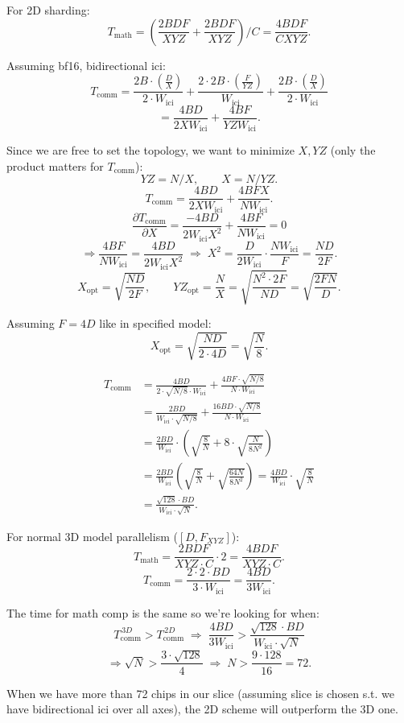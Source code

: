 \documentclass[11pt]{article}
\newcommand{\Tmath}{T_{\text{math}}}
\newcommand{\Tcomm}{T_{\text{comm}}}
\newcommand{\Wici}{W_{\text{ici}}}
\begin{document}
For 2D sharding:
\[
\Tmath = \left( \frac{2BDF}{XYZ} + \frac{2BDF}{XYZ} \right) \bigg/ C = \frac{4BDF}{CXYZ}.
\]

Assuming bf16, bidirectional ici:
\[
\Tcomm = \frac{2B \cdot \left( \frac{D}{X} \right)}{2 \cdot \Wici} + \frac{2 \cdot 2B \cdot \left( \frac{F}{YZ} \right)}{\Wici} + \frac{2B \cdot \left( \frac{D}{X} \right)}{2 \cdot \Wici}
\]
\[
= \frac{4BD}{2X\Wici} + \frac{4BF}{YZ\Wici}.
\]

Since we are free to set the topology, we want to minimize $X, YZ$ (only the product matters for $\Tcomm$):
\[
YZ = N/X, \qquad X = N/YZ.
\]
\[
\Tcomm = \frac{4BD}{2X\Wici} + \frac{4BFX}{N\Wici}.
\]
\[
\frac{\partial \Tcomm}{\partial X} = \frac{-4BD}{2\Wici X^2} + \frac{4BF}{N\Wici} = 0
\]
\[
\Rightarrow \frac{4BF}{N\Wici} = \frac{4BD}{2\Wici X^2} \;\Rightarrow\; X^2 = \frac{D}{2\Wici} \cdot \frac{N\Wici}{F} = \frac{ND}{2F}.
\]
\[
X_{\text{opt}} = \sqrt{\frac{ND}{2F}}, \qquad YZ_{\text{opt}} = \frac{N}{X} = \sqrt{\frac{N^2 \cdot 2F}{ND}} = \sqrt{\frac{2FN}{D}}.
\]

Assuming $F = 4D$ like in specified model:
\[
X_{\text{opt}} = \sqrt{\frac{ND}{2 \cdot 4D}} = \sqrt{\frac{N}{8}}.
\]

\begin{align*}
\Tcomm &= \frac{4BD}{2 \cdot \sqrt{N/8} \cdot \Wici} + \frac{4BF \cdot \sqrt{N/8}}{N \cdot \Wici} \\
&= \frac{2BD}{\Wici \cdot \sqrt{N/8}} + \frac{16BD \cdot \sqrt{N/8}}{N \cdot \Wici} \\
&= \frac{2BD}{\Wici} \cdot \left( \sqrt{\frac{8}{N}} + 8 \cdot \sqrt{\frac{N}{8N^2}} \right) \\
&= \frac{2BD}{\Wici} \left( \sqrt{\frac{8}{N}} + \sqrt{\frac{64N}{8N^2}} \right) = \frac{4BD}{\Wici} \cdot \sqrt{\frac{8}{N}} \\
&= \frac{\sqrt{128} \cdot BD}{\Wici \cdot \sqrt{N}}.
\end{align*}

For normal 3D model parallelism ($[D, F_{XYZ}]$):
\[
\Tmath = \frac{2BDF}{XYZ \cdot C} \cdot 2 = \frac{4BDF}{XYZ \cdot C}.
\]
\[
\Tcomm = \frac{2 \cdot 2 \cdot BD}{3 \cdot \Wici} = \frac{4BD}{3\Wici}.
\]

The time for math comp is the same so we're looking for when:
\[
\Tcomm^{\,3D} > \Tcomm^{\,2D} \;\Rightarrow\; \frac{4BD}{3\Wici} > \frac{\sqrt{128} \cdot BD}{\Wici \cdot \sqrt{N}}
\]
\[
\Rightarrow \sqrt{N} > \frac{3 \cdot \sqrt{128}}{4} \;\Rightarrow\; N > \frac{9 \cdot 128}{16} = 72.
\]

When we have more than 72 chips in our slice (assuming slice is chosen s.t. we have bidirectional ici over all axes), the 2D scheme will outperform the 3D one.
\end{document}
